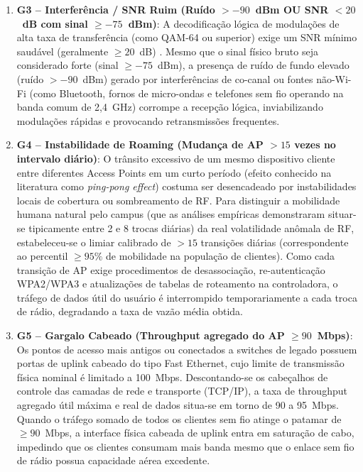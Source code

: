 \begin{enumerate}
    \item \textbf{G3 – Interferência / SNR Ruim (Ruído $> -90$~dBm OU SNR $< 20$~dB com sinal $\ge -75$~dBm)}: A decodificação lógica de modulações de alta taxa de transferência (como QAM-64 ou superior) exige um SNR mínimo saudável (geralmente $\ge 20$~dB) \cite{gast2005}. Mesmo que o sinal físico bruto seja considerado forte (sinal $\ge -75$~dBm), a presença de ruído de fundo elevado (ruído $> -90$~dBm) gerado por interferências de co-canal ou fontes não-Wi-Fi (como Bluetooth, fornos de micro-ondas e telefones sem fio operando na banda comum de 2,4~GHz) corrompe a recepção lógica, inviabilizando modulações rápidas e provocando retransmissões frequentes.
    
    \item \textbf{G4 – Instabilidade de Roaming (Mudança de AP $> 15$ vezes no intervalo diário)}: O trânsito excessivo de um mesmo dispositivo cliente entre diferentes Access Points em um curto período (efeito conhecido na literatura como \textit{ping-pong effect}) \cite{gast2005} costuma ser desencadeado por instabilidades locais de cobertura ou sombreamento de RF. Para distinguir a mobilidade humana natural pelo campus (que as análises empíricas demonstraram situar-se tipicamente entre 2 e 8 trocas diárias) da real volatilidade anômala de RF, estabeleceu-se o limiar calibrado de $> 15$ transições diárias (correspondente ao percentil $\ge 95\%$ de mobilidade na população de clientes). Como cada transição de AP exige procedimentos de desassociação, re-autenticação WPA2/WPA3 e atualizações de tabelas de roteamento na controladora, o tráfego de dados útil do usuário é interrompido temporariamente a cada troca de rádio, degradando a taxa de vazão média obtida.
    
    \item \textbf{G5 – Gargalo Cabeado (Throughput agregado do AP $\ge 90$~Mbps)}: Os pontos de acesso mais antigos ou conectados a switches de legado possuem portas de uplink cabeado do tipo Fast Ethernet, cujo limite de transmissão física nominal é limitado a 100~Mbps. Descontando-se os cabeçalhos de controle das camadas de rede e transporte (TCP/IP), a taxa de throughput agregado útil máxima e real de dados situa-se em torno de 90 a 95~Mbps. Quando o tráfego somado de todos os clientes sem fio atinge o patamar de $\ge 90$~Mbps, a interface física cabeada de uplink entra em saturação de cabo, impedindo que os clientes consumam mais banda mesmo que o enlace sem fio de rádio possua capacidade aérea excedente.
\end{enumerate}

